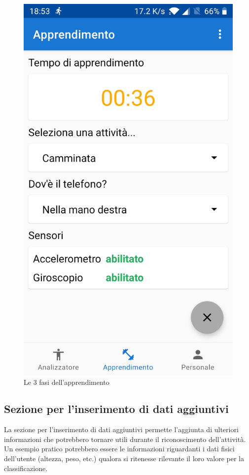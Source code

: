 \begin{figure}[H]
    \includegraphics[scale = 0.1019]{assets/images/screenshots/2c_Learning.jpg}
    \caption{Le 3 fasi dell'apprendimento}
    \label{fig:screenshots_learning}
\end{figure}


\subsection{Sezione per l'inserimento di dati aggiuntivi}
La sezione per l'inserimento di dati aggiuntivi permette l'aggiunta di ulteriori informazioni 
che potrebbero tornare utili durante il riconoscimento dell'attività.
Un esempio pratico potrebbero essere le informazioni riguardanti i dati fisici dell'utente (altezza, peso, etc.) qualora 
si ritenesse rilevante il loro valore per la classificazione.

